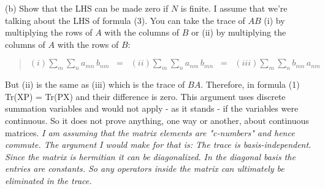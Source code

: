 \documentclass{article}
\begin{document}
(b) Show that the LHS can be made zero if $N$ is finite. I assume that we're
talking about the LHS of formula (3).
You can take the trace of $AB$ (i) by multiplying the rows of
$A$ with the columns of $B$ or (ii) by multiplying the columns of $A$
with the rows of $B$:
\begin{quote}
$
    (i) \sum_{m}\sum_{n} a_{mn}\,b_{nm}\;\;=\;\;
    (ii) \sum_{m}\sum_{n} a_{nm}\,b_{mn}\;\;=\;\;
    (iii) \sum_{m}\sum_{n} b_{mn}\,a_{nm}
$
\end{quote}
But (ii) is
the same as (iii) which is the trace of $BA$. Therefore, in formula (1)
Tr(XP) = Tr(PX) and their difference is zero. This argument uses
discrete summation variables and would not apply - as it stands -
if the variables were continuous. So it does not prove anything, one way
or another, about continuous matrices. {\it I am assuming that the
matrix elements are "c-numbers" and hence commute. The argument I would
make for that is: The trace is basis-independent. Since the matrix is
hermitian it can be diagonalized. In the diagonal basis the entries are
constants. So any operators inside the matrix can ultimately be eliminated
in the trace.
}
\end{document}
